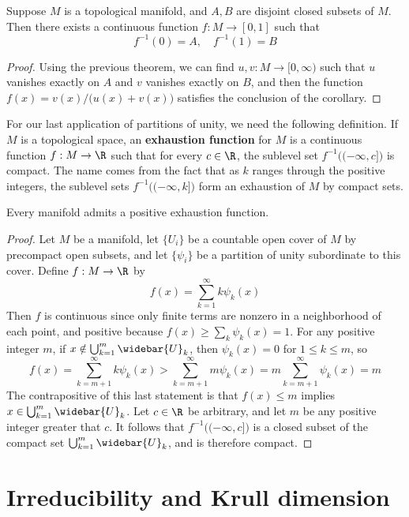 \begin{corollary}
Suppose $M$ is a topological manifold, and $A,B$ are disjoint closed subsets of $M$. Then there exists a continuous function $f:M\to [0,1]$ such that 
\[f^{-1}(0)=A,\quad f^{-1}(1)=B\]
\end{corollary}
\begin{proof}
Using the previous theorem, we can find $u,v: M\to [0,\infty)$ such that $u$ vanishes exactly on $A$ and $v$ vanishes exactly on $B$, and then the function $f(x)=v(x)/\big(u(x)+v(x)\big)$ satisfies the conclusion of the corollary.
\end{proof}
For our last application of partitions of unity, we need the following definition. If $M$ is a topological space, an \textbf{exhaustion function} for $M$ is a continuous function $f:M\to \R$ such that for every $c\in\R$, the sublevel set $f^{-1}\big((-\infty,c]\big)$ is compact. The name comes from the fact that as $k$ ranges through the positive integers, the sublevel sets $f^{-1}\big((-\infty,k]\big)$ form an exhaustion of $M$ by compact sets.
\begin{theorem}\label{exhaustion functions}
Every manifold admits a positive exhaustion function.
\end{theorem}
\begin{proof}
Let $M$ be a manifold, let $\{U_i\}$ be a countable open cover of $M$ by precompact open subsets, and let $\{\psi_i\}$ be a partition of unity subordinate to this cover. Define $f:M\to\R$ by
\[f(x)=\sum_{k=1}^{\infty}k\psi_k(x)\]
Then $f$ is continuous since only finite terms are nonzero in a neighborhood of each point, and positive because $f(x)\geq\sum_{k}\psi_k(x)=1$. For any positive integer $m$, if $x\notin\bigcup_{k=1}^{m}\widebar{U}_k$, then $\psi_k(x)=0$ for $1\leq k\leq m$, so
\[f(x)=\sum_{k=m+1}^{\infty}k\psi_k(x)>\sum_{k=m+1}^{\infty}m\psi_k(x)=m\sum_{k=m+1}^{\infty}\psi_k(x)=m\]
The contrapositive of this last statement is that $f(x)\leq m$ implies $x\in\bigcup_{k=1}^{m}\widebar{U}_k$. Let $c\in\R$ be arbitrary, and let $m$ be any positive integer greater that $c$. It follows that $f^{-1}\big((-\infty,c]\big)$ is a closed subset of the compact set $\bigcup_{k=1}^{m}\widebar{U}_k$, and is therefore compact.
\end{proof}
\section{Irreducibility and Krull dimension}
